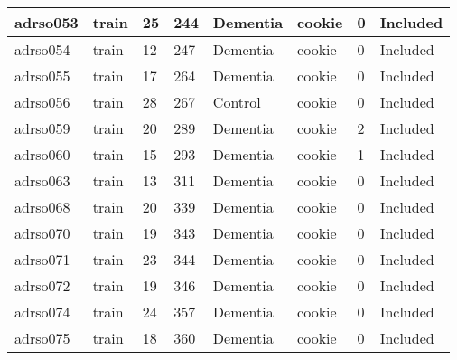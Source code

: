 \begin{center}
\begin{longtable}{|l|l|l|l|l|l|l|l|}
adrso053       & train                 & 25              & 244                & Dementia             & cookie          & 0                & Included      \\ \hline
adrso054       & train                 & 12              & 247                & Dementia             & cookie          & 0                & Included      \\ \hline
adrso055       & train                 & 17              & 264                & Dementia             & cookie          & 0                & Included      \\ \hline
adrso056       & train                 & 28              & 267                & Control              & cookie          & 0                & Included      \\ \hline
adrso059       & train                 & 20              & 289                & Dementia             & cookie          & 2                & Included      \\ \hline
adrso060       & train                 & 15              & 293                & Dementia             & cookie          & 1                & Included      \\ \hline
adrso063       & train                 & 13              & 311                & Dementia             & cookie          & 0                & Included      \\ \hline
adrso068       & train                 & 20              & 339                & Dementia             & cookie          & 0                & Included      \\ \hline
adrso070       & train                 & 19              & 343                & Dementia             & cookie          & 0                & Included      \\ \hline
adrso071       & train                 & 23              & 344                & Dementia             & cookie          & 0                & Included      \\ \hline
adrso072       & train                 & 19              & 346                & Dementia             & cookie          & 0                & Included      \\ \hline
adrso074       & train                 & 24              & 357                & Dementia             & cookie          & 0                & Included      \\ \hline
adrso075       & train                 & 18              & 360                & Dementia             & cookie          & 0                & Included      \\ \hline

\end{longtable}
\end{center}
